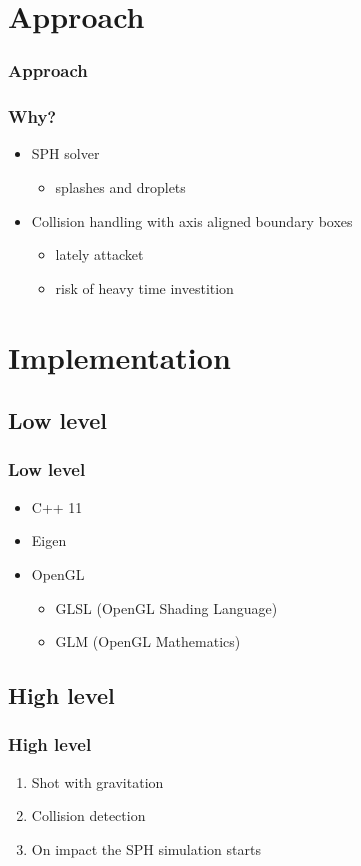 \section{Approach}
\begin{frame}
	 {\frametitle{Approach}}
	 {\frametitle{Why?}}
	\begin{itemize}[<+->]
		\item<1-> SPH solver
			\begin{itemize}
				\item<2-> splashes and droplets
			\end{itemize}
		\item Collision handling with axis aligned boundary boxes
			\begin{itemize}
					\item<2-> lately attacket
					\item<2-> risk of heavy time investition
			\end{itemize}
	\end{itemize}
\end{frame}
\section{Implementation}
\subsection{Low level}
\begin{frame}
	\frametitle{Low level}
	\begin{itemize}
		\item C++ 11
		\item Eigen
		\item OpenGL
			\begin{itemize}
				\item GLSL (OpenGL Shading Language)
				\item GLM (OpenGL Mathematics)
			\end{itemize}
	\end{itemize}
\end{frame}
\subsection{High level}
\begin{frame}
	\frametitle{High level}
	\begin{enumerate}
		\item Shot with gravitation
		\item Collision detection
		\item On impact the SPH simulation starts
	\end{enumerate}
\end{frame}

